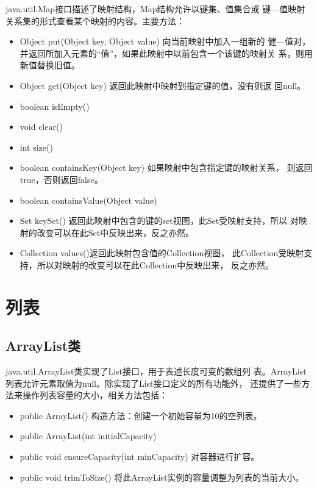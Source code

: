 java.util.Map接口描述了映射结构，Map结构允许以{\hei\Blue 键集、值集合或
  键—值映射关系集}的形式查看某个映射的内容。主要方法：
  
\begin{itemize}
\item Object put(Object key, Object value) 向当前映射中加入一组新的
  健—值对，并返回所加入元素的“值”，如果此映射中以前包含一个该键的映射关
  系，则用新值替换旧值。
\item Object get(Object key) 返回此映射中映射到指定键的值，没有则返
  回null。
\item boolean isEmpty()
\item void clear()
\item int size()
\item boolean containsKey(Object key) 如果映射中包含指定键的映射关系，
  则返回true，否则返回false。
\item boolean containsValue(Object value)
\item Set keySet() 返回此映射中包含的键的set视图，此Set受映射支持，所以
  对映射的改变可以在此Set中反映出来，反之亦然。
\item Collection values()返回此映射包含值的Collection视图，
  此Collection受映射支持，所以对映射的改变可以在此Collection中反映出来，
  反之亦然。
\end{itemize}

\section{列表}

\subsection{ArrayList类}

java.util.ArrayList类实现了List接口，用于表述长度可变的数组列
表。ArrayList列表允许元素取值为null。除实现了List接口定义的所有功能外，
还提供了一些方法来操作列表容量的大小，相关方法包括：

\begin{itemize}
\item public ArrayList() 构造方法：创建一个初始容量为10的空列表。
\item public ArrayList(int initialCapacity)
\item {\Red public void ensureCapacity(int minCapacity) 对容器进行扩容。}
\item public void trimToSize() 将此ArrayList实例的容量调整为列表的当前大小。
\end{itemize}

